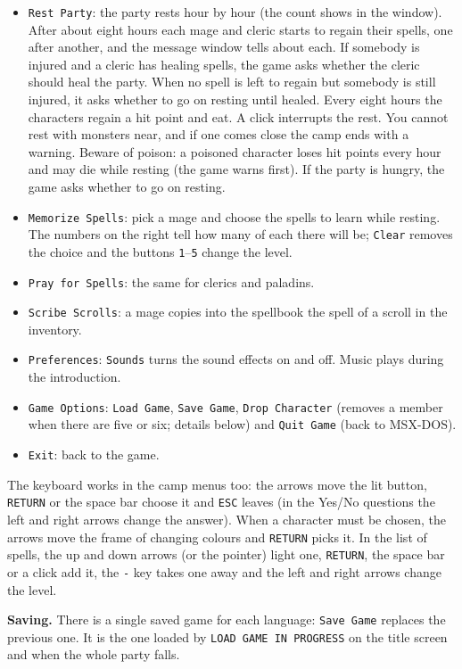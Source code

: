 \begin{itemize}
\item \texttt{Rest Party}: the party rests hour by hour (the count shows in the window). After about eight hours each mage and cleric starts to regain their spells, one after another, and the message window tells about each. If somebody is injured and a cleric has healing spells, the game asks whether the cleric should heal the party. When no spell is left to regain but somebody is still injured, it asks whether to go on resting until healed. Every eight hours the characters regain a hit point and eat. A click interrupts the rest. You cannot rest with monsters near, and if one comes close the camp ends with a warning. Beware of poison: a poisoned character loses hit points every hour and may die while resting (the game warns first). If the party is hungry, the game asks whether to go on resting.
\item \texttt{Memorize Spells}: pick a mage and choose the spells to learn while resting. The numbers on the right tell how many of each there will be; \texttt{Clear} removes the choice and the buttons \texttt{1}--\texttt{5} change the level.
\item \texttt{Pray for Spells}: the same for clerics and paladins.
\item \texttt{Scribe Scrolls}: a mage copies into the spellbook the spell of a scroll in the inventory.
\item \texttt{Preferences}: \texttt{Sounds} turns the sound effects on and off. Music plays during the introduction.
\item \texttt{Game Options}: \texttt{Load Game}, \texttt{Save Game}, \texttt{Drop Character} (removes a member when there are five or six; details below) and \texttt{Quit Game} (back to MSX-DOS).
\item \texttt{Exit}: back to the game.
\end{itemize}

The keyboard works in the camp menus too: the arrows move the lit button, \texttt{RETURN} or the space bar choose it and \texttt{ESC} leaves (in the Yes/No questions the left and right arrows change the answer). When a character must be chosen, the arrows move the frame of changing colours and \texttt{RETURN} picks it. In the list of spells, the up and down arrows (or the pointer) light one, \texttt{RETURN}, the space bar or a click add it, the \texttt{-} key takes one away and the left and right arrows change the level.

\textbf{Saving.} There is a single saved game for each language: \texttt{Save Game} replaces the previous one. It is the one loaded by \texttt{LOAD GAME IN PROGRESS} on the title screen and when the whole party falls.






